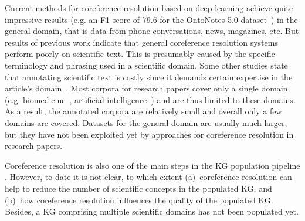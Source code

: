 \documentclass[runningheads]{llncs}
\begin{document}
Current methods for coreference resolution based on deep learning achieve quite impressive results (e.g. an F1 score of 79.6 for the OntoNotes 5.0 dataset~\cite{Joshi2020SpanBERT}) in the general domain, that is data from phone conversations, news, magazines, etc. 
But results of previous work indicate \cite{CohenLCBBPVPH17Craft,KimNWTTY12,NguyenKMMT12,SchaferSS12CorefACL} that general coreference resolution systems perform poorly on scientific text. This is presumably caused by the specific terminology and phrasing used in a scientific domain. 
Some other studies state that annotating scientific text is costly since it demands certain expertise in the article’s domain~\cite{augenstein2017semeval,Brack2020DomainindependentEO,gabor2018semeval}.
Most corpora for research papers cover only a single domain (e.g. bio\-medicine~\cite{CohenLCBBPVPH17Craft}, 
artificial intelligence~\cite{Luan2018MultiTaskIO}) and are thus limited to these domains. 
As a result, the annotated corpora are relatively small and overall only a few domains are covered. 
Datasets for the general domain are usually much larger, but they have not been exploited yet by approaches for coreference resolution in research papers.

Coreference resolution is also one of the main steps in the KG population pipeline \cite{LubaniNM19,Pujara2018MiningKG}. 
However, to date it is not clear, to which extent (a)~coreference resolution can help to reduce the number of scientific concepts in the populated KG, and (b)~how coreference resolution influences the quality of the populated KG. 
Besides, a KG comprising multiple scientific domains has not been populated yet.
\end{document}
